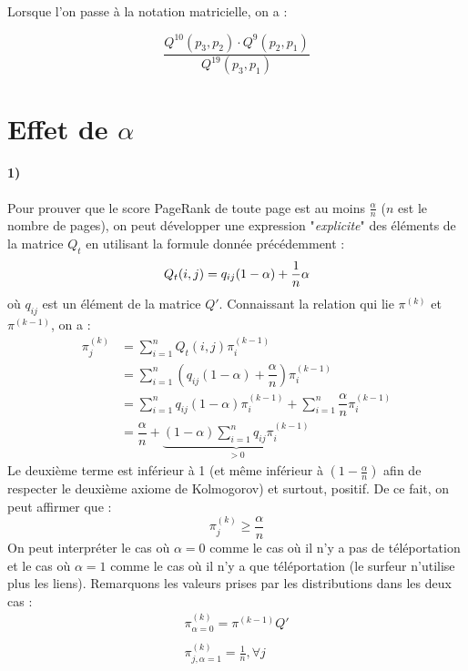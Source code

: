 \documentclass[a4paper,titlepage]{report}
\begin{document}
Lorsque l'on passe à la notation matricielle, on a :

$$\dfrac{Q^{10}(p_3, p_2) \cdot Q^{9}(p_2, p_1)}{Q^{19}(p_3, p_1)}
$$



\section{Effet de $\alpha$}
\label{sec:effet_alpha}
\paragraph{1)}
Pour prouver que le score PageRank de toute page est au moins $\frac{\alpha}{n}$ ($n$ est le nombre de pages), on peut développer une expression "\textit{explicite}" des éléments de la matrice $Q_t$ en utilisant la formule donnée précédemment : 
\[
Q_t(i,j) = q_{ij} (1 - \alpha) + \dfrac{1}{n}\alpha\\
\]
où $q_{ij}$ est un élément de la matrice $Q'$. Connaissant la relation qui lie $\pi^{(k)}$ et $\pi^{(k-1)}$, on a :
\[
\begin{aligned}
\pi^{(k)}_j &= \sum\limits_{i = 1}^n Q_t(i,j)\pi^{(k-1)}_i\\
 &= \sum\limits_{i = 1}^n \left(q_{ij} (1 - \alpha) + \dfrac{\alpha}{n}\right)\pi^{(k-1)}_i\\
 &= \sum\limits_{i = 1}^n q_{ij} (1 - \alpha) \pi^{(k-1)}_i + \sum\limits_{i = 1}^n \dfrac{\alpha}{n} \pi^{(k-1)}_i\\
 &= \dfrac{\alpha}{n} + \underbrace{(1 - \alpha) \sum\limits_{i = 1}^n q_{ij} \pi^{(k-1)}_i}_{> 0}
\end{aligned}
\]
Le deuxième terme est inférieur à 1 (et même inférieur à $(1 - \frac{\alpha}{n})$ afin de respecter le deuxième axiome de Kolmogorov) et surtout, positif. De ce fait, on peut affirmer que :
\[
\pi^{(k)}_j \geq \dfrac{\alpha}{n}
\]
On peut interpréter le cas où $\alpha = 0$ comme le cas où il n'y a pas de téléportation et le cas où $\alpha = 1$ comme le cas où il n'y a que téléportation (le surfeur n'utilise plus les liens). Remarquons les valeurs prises par les distributions dans les deux cas :
\[
\begin{array}{l}
\pi_{\alpha = 0}^{(k)} = \pi^{(k-1)} Q'\\ \\
\pi_{j,\alpha = 1}^{(k)} = \frac{1}{n}, \forall j
\end{array}
\]
\end{document}
